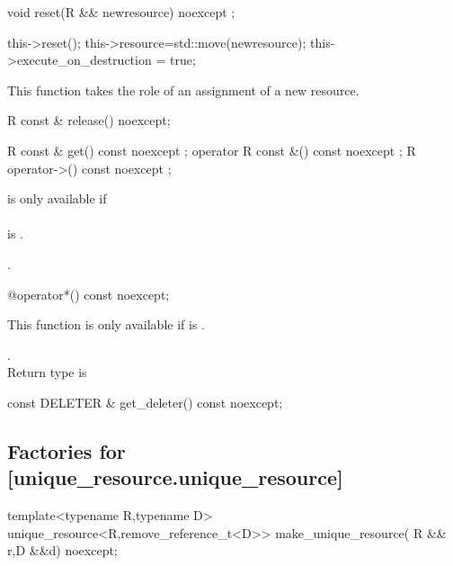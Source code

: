 \documentclass[ebook,11pt,article]{memoir}
\begin{document}
\begin{itemdecl}
void reset(R && newresource) noexcept ;
\end{itemdecl}

\pnum
\effects 
\begin{codeblock}
this->reset(); 
this->resource=std::move(newresource);
this->execute_on_destruction = true;
\end{codeblock}

\pnum
\enternote This function takes the role of an assignment of a new resource.
\exitnote

\begin{itemdecl}
R const & release() noexcept;
\end{itemdecl}

\pnum
\effects {}

\pnum
\returns {}


\begin{itemdecl}
R const & get() const noexcept ;
operator  R const &() const noexcept ;
R operator->() const noexcept ;
\end{itemdecl}

\pnum
\requires {} is only available if \\
\\ is . 

\pnum
\returns {}.

\begin{itemdecl}
@\seebelow@  operator*() const noexcept;
\end{itemdecl}

\pnum
\requires This function is only available if  is . 

\pnum
\returns {}. 
\\Return type is 


\begin{itemdecl}
const DELETER & get_deleter() const noexcept;
\end{itemdecl}

\pnum
\returns {}

\subsection {Factories for  [unique_resource.unique_resource]}
\begin{itemdecl}
template<typename R,typename D>
unique_resource<R,remove_reference_t<D>>
make_unique_resource( R && r,D &&d) noexcept;
\end{itemdecl}
\end{document}
